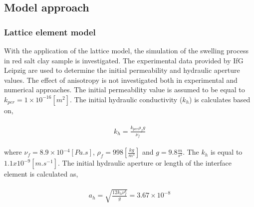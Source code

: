 \subsection{Model approach}
\subsubsection*{Lattice element model}

With the application of the lattice model, the simulation of the swelling process in red salt clay sample is investigated. The experimental data provided by IfG Leipzig are used to determine the initial permeability and hydraulic aperture values. The effect of anisotropy is not investigated both in experimental and numerical approaches. The initial permeability value is assumed to be equal to $k_{per}=1\times10^{-16} [m^2]$. The initial hydraulic conductivity ($k_{h}$) is calculates based on,

\begin{align}
\label{eq:LEM_ME5_1}
\begin{split}
k_{h}=\frac{k_{per}\rho_fg}{\nu_f}
\end{split}
\end{align}

where $\nu_f=8.9\times{10}{^{-4} [Pa.s]}$, $\rho_f=998 [\frac{kg}{m^3}]$ and $g=9.8 \frac{m}{s^2}$. The $k_{h}$ is equal to $1.1x10^{-9} [m.s^{-1}]$. The initial hydraulic aperture or length of the interface element is calculated as,

\begin{align}
\label{eq:LEM_ME5_2}
\begin{split}
a_h=\sqrt{\frac{12k_h\nu_f^{k}}{g}}=3.67\times10^{-8}
\end{split}
\end{align}

